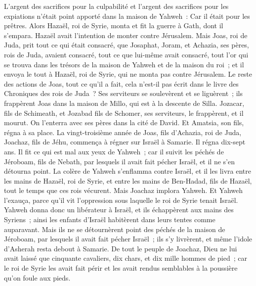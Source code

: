 \begin{multicols}{2}
L'argent des sacrifices pour la culpabilité et l'argent des sacrifices pour les expiations n'était point apporté dans la maison de Yahweh~: Car il était pour les prêtres.
Alors Hazaël, roi de Syrie, monta et fit la guerre à Gath, dont il s'empara. Hazaël avait l'intention de monter contre Jérusalem.
Mais Joas, roi de Juda, prit tout ce qui était consacré, que Josaphat, Joram, et Achazia, ses pères, rois de Juda, avaient consacré, tout ce que lui-même avait consacré, tout l'or qui se trouva dans les trésors de la maison de Yahweh et de la maison du roi~; et il envoya le tout à Hazaël, roi de Syrie, qui ne monta pas contre Jérusalem.
Le reste des actions de Joas, tout ce qu'il a fait, cela n'est-il pas écrit dans le livre des Chroniques des rois de Juda~?
Ses serviteurs se soulevèrent et se liguèrent~; ils frappèrent Joas dans la maison de Millo, qui est à la descente de Silla.
Jozacar, fils de Schimeath, et Jozabad fils de Schomer, ses serviteurs, le frappèrent, et il mourut. On l'enterra avec ses pères dans la cité de David. Et Amatsia, son fils, régna à sa place.
\VerseOne{}La vingt-troisième année de Joas, fils d'Achazia, roi de Juda, Joachaz, fils de Jéhu, commença à régner sur Israël à Samarie. Il régna dix-sept ans.
Il fit ce qui est mal aux yeux de Yahweh~; car il suivit les péchés de Jéroboam, fils de Nebath, par lesquels il avait fait pécher Israël, et il ne s'en détourna point.
La colère de Yahweh s'enflamma contre Israël, et il les livra entre les mains de Hazaël, roi de Syrie, et entre les mains de Ben-Hadad, fils de Hazaël, tout le temps que ces rois vécurent.
Mais Joachaz implora Yahweh. Et Yahweh l'exauça, parce qu'il vit l'oppression sous laquelle le roi de Syrie tenait Israël.
Yahweh donna donc un libérateur à Israël, et ils échappèrent aux mains des Syriens~; ainsi les enfants d'Israël habitèrent dans leurs tentes comme auparavant.
Mais ils ne se détournèrent point des péchés de la maison de Jéroboam, par lesquels il avait fait pécher Israël~; ils s'y livrèrent, et même l'idole d'Asherah resta debout à Samarie.
De tout le peuple de Joachaz, Dieu ne lui avait laissé que cinquante cavaliers, dix chars, et dix mille hommes de pied~; car le roi de Syrie les avait fait périr et les avait rendus semblables à la poussière qu'on foule aux pieds.

\end{multicols}
